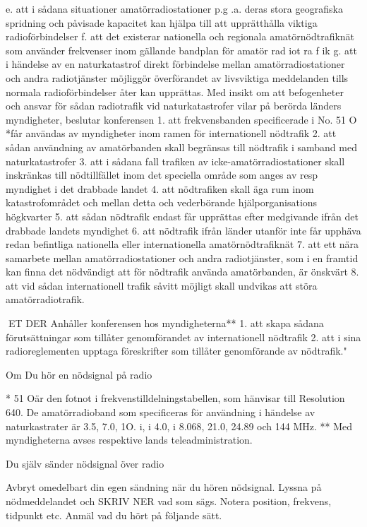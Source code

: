 e. att i sådana situationer amatörradiostationer p.g .a. deras stora geografiska spridning och påvisade kapacitet kan hjälpa till
att upprätthålla viktiga radioförbindelser
f. att det existerar nationella och regionala
amatörnödtrafiknät som använder frekvenser inom gällande bandplan för amatör rad iot ra f ik
g. att i händelse av en naturkatastrof direkt
förbindelse mellan amatörradiostationer
och andra radiotjänster möjliggör överförandet av livsviktiga meddelanden tills
normala radioförbindelser åter kan upprättas.
Med insikt om att befogenheter och ansvar
för sådan radiotrafik vid naturkatastrofer vilar på berörda länders myndigheter, beslutar
konferensen
1. att frekvensbanden specificerade i No.
51 O *får användas av myndigheter inom
ramen för internationell nödtrafik
2. att sådan användning av amatörbanden
skall begränsas till nödtrafik i samband
med naturkatastrofer
3. att i sådana fall trafiken av icke-amatörradiostationer skall inskränkas till nödtillfället inom det speciella område som
anges av resp myndighet i det drabbade
landet
4. att nödtrafiken skall äga rum inom
katastrofområdet och mellan detta och
vederbörande hjälporganisations högkvarter
5. att sådan nödtrafik endast får upprättas
efter medgivande ifrån det drabbade landets myndighet
6. att nödtrafik ifrån länder utanför inte får
upphäva redan befintliga nationella eller
internationella amatörnödtrafiknät
7. att ett nära samarbete mellan amatörradiostationer och andra radiotjänster,
som i en framtid kan finna det nödvändigt
att för nödtrafik använda amatörbanden,
är önskvärt
8. att vid sådan internationell trafik såvitt
möjligt skall undvikas att störa amatörradiotrafik.

ET DER
Anhåller konferensen hos myndigheterna**
1. att skapa sådana förutsättningar som tillåter genomförandet av internationell nödtrafik
2. att i sina radioreglementen upptaga föreskrifter som tillåter genomförande av nödtrafik."

Om Du hör en nödsignal på radio

* 51 Oär den fotnot i frekvenstilldelningstabellen, som hänvisar till Resolution 640.
De amatörradioband som specificeras för
användning i händelse av naturkastrater
är 3.5, 7.0, 1O. i, i 4.0, i 8.068, 21.0, 24.89
och 144 MHz.
** Med myndigheterna avses respektive
lands teleadministration.

Du själv sänder nödsignal över radio

Avbryt omedelbart din egen sändning när du
hören nödsignal. Lyssna på nödmeddelandet
och SKRIV NER vad som sägs. Notera position, frekvens, tidpunkt etc. Anmäl vad du
hört på följande sätt.

